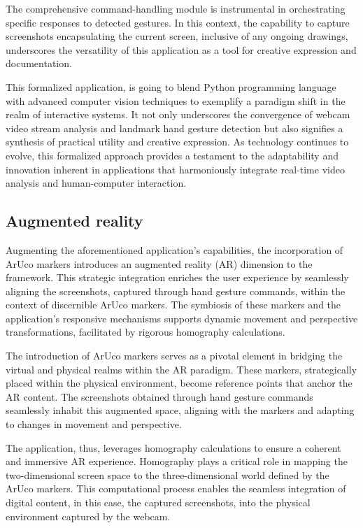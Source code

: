 \documentclass[journal]{IEEEtran}
\begin{document}
The comprehensive command-handling module is instrumental in orchestrating specific responses to detected gestures. In this context, 
the capability to capture screenshots encapsulating the current screen, inclusive of any ongoing drawings, underscores the versatility 
of this application as a tool for creative expression and documentation.

This formalized application, is going to blend Python programming language with advanced computer vision techniques to exemplify a paradigm 
shift in the realm of interactive systems. It not only underscores the convergence of webcam video stream analysis and landmark hand 
gesture detection but also signifies a synthesis of practical utility and creative expression. As technology continues to evolve, 
this formalized approach provides a testament to the adaptability and innovation inherent in applications that harmoniously integrate 
real-time video analysis and human-computer interaction.

\subsection*{Augmented reality}
Augmenting the aforementioned application's capabilities, the incorporation of ArUco markers introduces an augmented reality (AR) 
dimension to the framework. This strategic integration enriches the user experience by seamlessly aligning the screenshots, captured 
through hand gesture commands, within the context of discernible ArUco markers. The symbiosis of these markers and the application's 
responsive mechanisms supports dynamic movement and perspective transformations, facilitated by rigorous homography calculations.

The introduction of ArUco markers serves as a pivotal element in bridging the virtual and physical realms within the AR paradigm. 
These markers, strategically placed within the physical environment, become reference points that anchor the AR content. 
The screenshots obtained through hand gesture commands seamlessly inhabit this augmented space, aligning with the markers and adapting 
to changes in movement and perspective.

The application, thus, leverages homography calculations to ensure a coherent and immersive AR experience. Homography plays a 
critical role in mapping the two-dimensional screen space to the three-dimensional world defined by the ArUco markers. This computational 
process enables the seamless integration of digital content, in this case, the captured screenshots, into the physical environment 
captured by the webcam.
\end{document}

